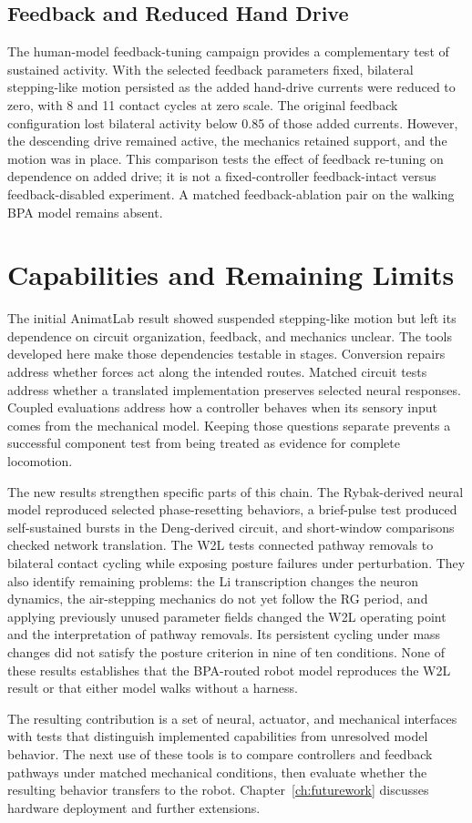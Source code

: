 \subsection{Feedback and Reduced Hand Drive}

The human-model feedback-tuning campaign provides a complementary test of sustained activity. With the selected feedback parameters fixed, bilateral stepping-like motion persisted as the added hand-drive currents were reduced to zero, with 8 and 11 contact cycles at zero scale. The original feedback configuration lost bilateral activity below 0.85 of those added currents. However, the descending drive remained active, the mechanics retained support, and the motion was in place. This comparison tests the effect of feedback re-tuning on dependence on added drive; it is not a fixed-controller feedback-intact versus feedback-disabled experiment. A matched feedback-ablation pair on the walking BPA model remains absent.

\section{Capabilities and Remaining Limits}\label{sec:sns_discussion}

The initial AnimatLab result showed suspended stepping-like motion but left its dependence on circuit organization, feedback, and mechanics unclear. The tools developed here make those dependencies testable in stages. Conversion repairs address whether forces act along the intended routes. Matched circuit tests address whether a translated implementation preserves selected neural responses. Coupled evaluations address how a controller behaves when its sensory input comes from the mechanical model. Keeping those questions separate prevents a successful component test from being treated as evidence for complete locomotion.

The new results strengthen specific parts of this chain. The Rybak-derived neural model reproduced selected phase-resetting behaviors, a brief-pulse test produced self-sustained bursts in the Deng-derived circuit, and short-window comparisons checked network translation. The W2L tests connected pathway removals to bilateral contact cycling while exposing posture failures under perturbation. They also identify remaining problems: the Li transcription changes the neuron dynamics, the air-stepping mechanics do not yet follow the RG period, and applying previously unused parameter fields changed the W2L operating point and the interpretation of pathway removals. Its persistent cycling under mass changes did not satisfy the posture criterion in nine of ten conditions. None of these results establishes that the BPA-routed robot model reproduces the W2L result or that either model walks without a harness.

The resulting contribution is a set of neural, actuator, and mechanical interfaces with tests that distinguish implemented capabilities from unresolved model behavior. The next use of these tools is to compare controllers and feedback pathways under matched mechanical conditions, then evaluate whether the resulting behavior transfers to the robot. Chapter~\ref{ch:futurework} discusses hardware deployment and further extensions.
